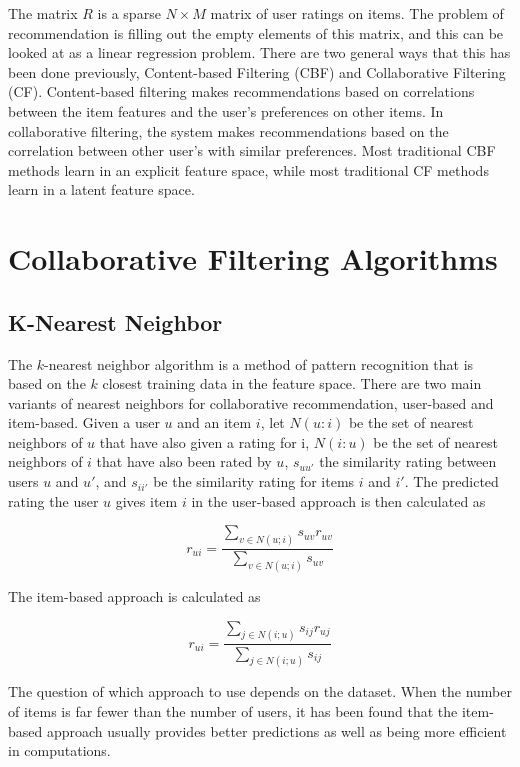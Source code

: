 The matrix $R$ is a sparse $N \times M$ matrix of user ratings on items. The problem of recommendation is filling out the empty elements of this matrix, and this can be looked at as a linear regression problem. There are two general ways that this has been done previously, Content-based Filtering (CBF) and Collaborative Filtering (CF). Content-based filtering makes recommendations based on correlations between the item features and the user's preferences on other items. In collaborative filtering, the system makes recommendations based on the correlation between other user's with similar preferences. Most traditional CBF methods learn in an explicit feature space, while most traditional CF methods learn in a latent feature space. 

\section{Collaborative Filtering Algorithms}
\subsection{K-Nearest Neighbor}

The $k$-nearest neighbor algorithm is a method of pattern recognition that is based on the $k$ closest training data in the feature space. There are two main variants of nearest neighbors for collaborative recommendation, user-based and item-based. Given a user $u$ and an item $i$, let $N(u:i)$ be the set of nearest neighbors of $u$ that have also given a rating for i, $N(i:u)$ be the set of nearest neighbors of $i$ that have also been rated by $u$, $s_{uu'}$ the similarity rating between users $u$ and $u'$, and $s_{ii'}$ be the similarity rating for items $i$ and $i'$. The predicted rating the user $u$ gives item $i$ in the user-based approach is then calculated as

\[
r_{ui} = \frac    {\sum_{v\in N(u;i)} {s_{uv}r_{uv}} } {\sum_{v\in N(u;i)}{s_{uv}}}
\]

The item-based approach is calculated as 

\[
r_{ui} = \frac    {\sum_{j\in N(i;u)} {s_{ij}r_{uj}} } {\sum_{j\in N(i;u)}{s_{ij}}}
\]

The question of which approach to use depends on the dataset. When the number of items is far fewer than the number of users, it has been found that the item-based approach usually provides better predictions as well as being more efficient in computations. 

\begin{comment}
This applies to the MovieLens 1 Million dataset as well. For the MovieLens 100,000 dataset, the number of items is larger than the number of users, and the user-based approach has been found to perform better.
\end{comment}

